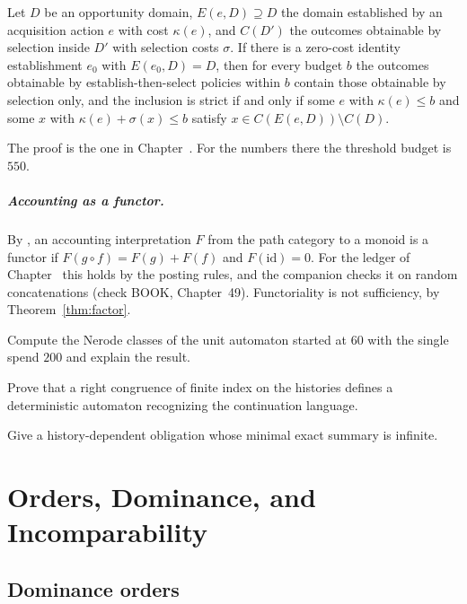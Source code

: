 \begin{theorem}\label{thm:P02f}
Let $D$ be an opportunity domain, $E(e,D)\supseteq D$ the domain established by an acquisition action $e$ with cost $\kappa(e)$, and $C(D')$ the outcomes obtainable by selection inside $D'$ with selection costs $\sigma$. If there is a zero-cost identity establishment $e_0$ with $E(e_0,D)=D$, then for every budget $b$ the outcomes obtainable by establish-then-select policies within $b$ contain those obtainable by selection only, and the inclusion is strict if and only if some $e$ with $\kappa(e)\le b$ and some $x$ with $\kappa(e)+\sigma(x)\le b$ satisfy $x\in C(E(e,D))\setminus C(D)$.
\end{theorem}

The proof is the one in Chapter~. For the numbers there the threshold budget is $550$.

\paragraph{Accounting as a functor.} By , an accounting interpretation $F$ from the path category to a monoid is a functor if $F(g\circ f)=F(g)+F(f)$ and $F(\mathrm{id})=0$. For the ledger of Chapter~ this holds by the posting rules, and the companion checks it on random concatenations (check BOOK, Chapter~49). Functoriality is not sufficiency, by Theorem~\ref{thm:factor}.

\begin{exercise}
Compute the Nerode classes of the unit automaton started at $60$ with the single spend $200$ and explain the result.
\end{exercise}
\begin{exercise}
Prove that a right congruence of finite index on the histories defines a deterministic automaton recognizing the continuation language.
\end{exercise}
\begin{exercise}
Give a history-dependent obligation whose minimal exact summary is infinite.
\end{exercise}

\chapter{Orders, Dominance, and Incomparability}\label{ch:42}

\section{Dominance orders}

